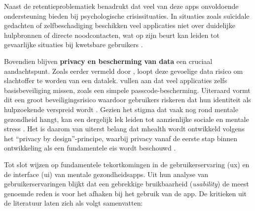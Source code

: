 \vspace{1em}

Naast de retentieproblematiek benadrukt \textcite{Koh2022} dat veel van deze apps onvoldoende ondersteuning bieden bij psychologische crisissituaties. In situaties zoals suïcidale gedachten of zelfbeschadiging beschikken veel applicaties niet over duidelijke hulpbronnen of directe noodcontacten, wat op zijn beurt kan leiden tot gevaarlijke situaties bij kwetsbare gebruikers \autocite{Koh2022}. 

\vspace{1em}

Bovendien blijven \textbf{privacy en bescherming van data} een cruciaal aandachtspunt. Zoals eerder vermeld door \textcite{Iwaya2022}, loopt deze gevoelige data risico om slachtoffer te worden van een datalek. \textcite{Koh2022} vullen aan dat veel applicaties zelfs basisbeveiliging missen, zoals een simpele passcode-bescherming. Uiteraard vormt dit een groot beveiligingsrisico waardoor gebruikers riskeren dat hun identiteit als hulpzoekende verspreid wordt \autocite{Koh2022}. Gezien het stigma dat vaak nog rond mentale gezondheid hangt, kan een dergelijk lek leiden tot aanzienlijke sociale en mentale stress \autocite{Iwaya2022}. Het is daarom van uiterst belang dat \acrshort{mhealth} wordt ontwikkeld volgens het “privacy by design”-principe, waarbij privacy vanaf de eerste stap binnen ontwikkeling als een fundamentele eis wordt beschouwd \autocite{Iwaya2022}.

\vspace{1em}

Tot slot wijzen \textcite{Alqahtani2020} op fundamentele tekortkomingen in de gebruikerservaring (\acrshort{ux}) en de interface (\acrshort{ui}) van mentale gezondheidsapps. Uit hun analyse van gebruikerservaringen blijkt dat een gebrekkige bruikbaarheid (\textit{usability}) de meest genoemde reden is voor het afhaken bij het gebruik van de app. De kritieken uit de literatuur laten zich als volgt samenvatten:

